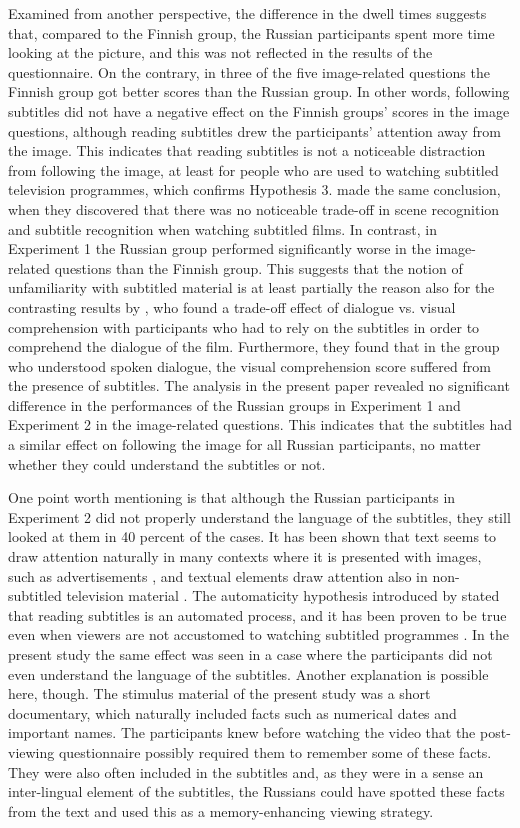 \documentclass[output=paper]{langsci/langscibook}
\begin{document}
Examined from another perspective, the difference in the dwell times suggests that, compared to the Finnish group, the Russian participants spent more time looking at the picture, and this was not reflected in the results of the questionnaire. On the contrary, in three of the five image-related questions the Finnish group got better scores than the Russian group. In other words, following subtitles did not have a negative effect on the Finnish groups’ scores in the image questions, although reading subtitles drew the participants’ attention away from the image. This indicates that reading subtitles is not a noticeable distraction from following the image, at least for people who are used to watching subtitled television programmes, which confirms Hypothesis 3. \citet{Perego2010} made the same conclusion, when they discovered that there was no noticeable trade-off in scene recognition and subtitle recognition when watching subtitled films. In contrast, in Experiment 1 the Russian group performed significantly worse in the image-related questions than the Finnish group. This suggests that the notion of unfamiliarity with subtitled material is at least partially the reason also for the contrasting results by \citet{lavaur2011}, who found a trade-off effect of dialogue vs. visual comprehension with participants who had to rely on the subtitles in order to comprehend the dialogue of the film. Furthermore, they found that in the group who understood spoken dialogue, the visual comprehension score suffered from the presence of subtitles. The analysis in the present paper revealed no significant difference in the performances of the Russian groups in Experiment 1 and Experiment 2 in the image-related questions. This indicates that the subtitles had a similar effect on following the image for all Russian participants, no matter whether they could understand the subtitles or not.

One point worth mentioning is that although the Russian participants in Experiment 2 did not properly understand the language of the subtitles, they still looked at them in 40 percent of the cases. It has been shown that text seems to draw attention naturally in many contexts where it is presented with images, such as advertisements \citep{rayner2001,rayner2008}, and textual elements draw attention also in non-subtitled television material \citep{tosi1997}. The automaticity hypothesis introduced by \citet{dydewalle1987} stated that reading subtitles is an automated process, and it has been proven to be true even when viewers are not accustomed to watching subtitled programmes \citep{dydewalle1991}. In the present study the same effect was seen in a case where the participants did not even understand the language of the subtitles. Another explanation is possible here, though. The stimulus material of the present study was a short documentary, which naturally included facts such as numerical dates and important names. The participants knew before watching the video that the post-viewing questionnaire possibly required them to remember some of these facts. They were also often included in the subtitles and, as they were in a sense an inter-lingual element of the subtitles, the Russians could have spotted these facts from the text and used this as a memory-enhancing viewing strategy. 
\end{document}
